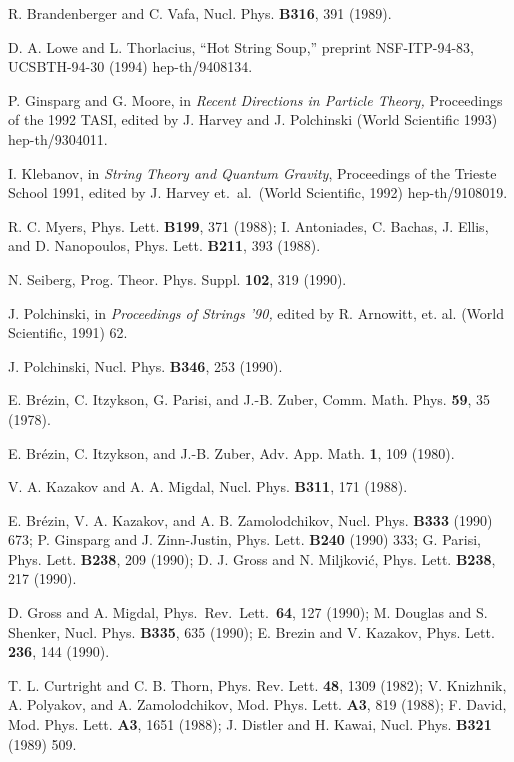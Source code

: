 \begin{thebibliography}{99}
 R. Brandenberger and C. Vafa, Nucl. Phys. {\bf
B316}, 391 (1989).

 D. A. Lowe and L. Thorlacius, ``Hot String Soup,''
preprint NSF-ITP-94-83, UCSBTH-94-30 (1994) hep-th/9408134.

 P. Ginsparg and G. Moore, in {\it Recent
Directions in Particle Theory,} Proceedings of the 1992 TASI,
edited by J. Harvey and J. Polchinski (World Scientific
1993) hep-th/9304011.

 I. Klebanov, in {\it String Theory and
Quantum Gravity}, Proceedings of the Trieste School 1991,
edited by J. Harvey et.~al.~(World Scientific, 1992)
hep-th/9108019.

 R. C. Myers, Phys. Lett. {\bf B199}, 371 (1988);
I. Antoniades, C. Bachas, J. Ellis, and D.
Nanopoulos, Phys. Lett. {\bf B211}, 393 (1988).

 N. Seiberg, Prog. Theor. Phys. Suppl. {\bf 102}, 319
(1990).

 J. Polchinski, in 
{\it Proceedings of Strings '90,} edited by R. Arnowitt,
et. al. (World Scientific, 1991) 62.

 J. Polchinski, Nucl. Phys. {\bf B346}, 253
(1990).

 E. Br\'ezin, C. Itzykson, G. Parisi, and J.-B. Zuber,
Comm. Math. Phys. {\bf 59}, 35 (1978).

 E. Br\'ezin, C. Itzykson, and J.-B. Zuber,
Adv. App. Math. {\bf 1}, 109 (1980).

 V. A. Kazakov and A. A. Migdal, Nucl. Phys. {\bf
B311}, 171 (1988).

 E. Br\'ezin, V. A. Kazakov, and A. B. Zamolodchikov,
Nucl. Phys. {\bf B333} (1990) 673;
P. Ginsparg and J. Zinn-Justin,
Phys. Lett. {\bf B240} (1990) 333;
G. Parisi, Phys. Lett. {\bf B238}, 209 (1990);
D. J. Gross and N. Miljkovi\'c,
Phys. Lett. {\bf B238}, 217 (1990).

 D. Gross and A. Migdal, Phys.~Rev.~Lett.~{\bf 64},
127 (1990);
M. Douglas and S. Shenker, Nucl. Phys. {\bf B335}, 635 (1990);
E. Brezin and V. Kazakov, Phys. Lett. {\bf 236},
144 (1990).

 T. L. Curtright and C. B. Thorn, Phys. Rev. Lett.
{\bf 48}, 1309 (1982);
V. Knizhnik, A. Polyakov, and A. Zamolodchikov, 
Mod. Phys. Lett. {\bf A3}, 819 (1988);
F. David, Mod. Phys. Lett. {\bf A3}, 1651
(1988);
J. Distler and H. Kawai, Nucl. Phys. {\bf
B321} (1989) 509.


\end{thebibliography}

